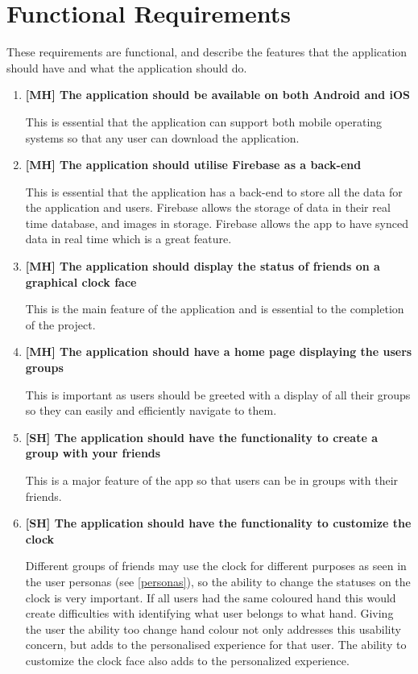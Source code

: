 \section{Functional Requirements} \label{functional}
These requirements are functional, and describe the features that the application should have and what the application should do. 
\begin{enumerate}
    \item \textbf{[MH] The application should be available on both Android and iOS} \par
    This is essential that the application can support both mobile operating systems so that any user can download the application.
    \item \textbf{[MH] The application should utilise Firebase as a back-end} \par
    This is essential that the application has a back-end to store all the data for the application and users. Firebase allows the storage of data in their real time database, and images in storage. Firebase allows the app to have synced data in real time which is a great feature.
    \item \textbf{[MH] The application should display the status of friends on a graphical clock face} \par
    This is the main feature of the application and is essential to the completion of the project.
    \item \textbf{[MH] The application should have a home page displaying the users groups} \par
    This is important as users should be greeted with a display of all their groups so they can easily and efficiently navigate to them.
    \item \textbf{[SH] The application should have the functionality to create a group with your friends} \par
    This is a major feature of the app so that users can be in groups with their friends.
    \item \textbf{[SH] The application should have the functionality to customize the clock} \par
    Different groups of friends may use the clock for different purposes as seen in the user personas (see \ref{personas}), so the ability to change the statuses on the clock is very important. If all users had the same coloured hand this would create difficulties with identifying what user belongs to what hand. Giving the user the ability too change hand colour not only addresses this usability concern, but adds to the personalised experience for that user. The ability to customize the clock face also adds to the personalized experience.

\end{enumerate}
